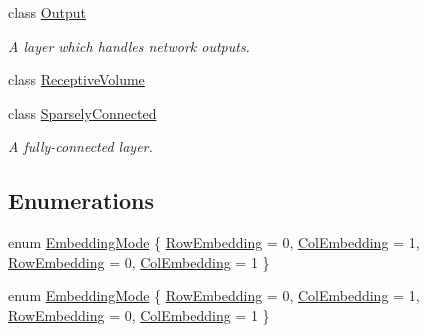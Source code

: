\begin{DoxyCompactItemize}
class \hyperlink{classffnn_1_1layer_1_1_output}{Output}
\begin{DoxyCompactList}\small\item\em A layer which handles network outputs. \end{DoxyCompactList}\item 
class \hyperlink{classffnn_1_1layer_1_1_receptive_volume}{Receptive\-Volume}
\item 
class \hyperlink{classffnn_1_1layer_1_1_sparsely_connected}{Sparsely\-Connected}
\begin{DoxyCompactList}\small\item\em A fully-\/connected layer. \end{DoxyCompactList}\end{DoxyCompactItemize}
\subsection*{Enumerations}
\begin{DoxyCompactItemize}
\item 
enum \hyperlink{namespaceffnn_1_1layer_a254f16beba4fb335d935e9b43bb9e69a}{Embedding\-Mode} \{ \hyperlink{namespaceffnn_1_1layer_a254f16beba4fb335d935e9b43bb9e69aa56bf723aeae4562f2fe05ae5e675da92}{Row\-Embedding} = 0, 
\hyperlink{namespaceffnn_1_1layer_a254f16beba4fb335d935e9b43bb9e69aaede1065f5863208cae7e55561966a182}{Col\-Embedding} = 1, 
\hyperlink{namespaceffnn_1_1layer_a254f16beba4fb335d935e9b43bb9e69aa56bf723aeae4562f2fe05ae5e675da92}{Row\-Embedding} = 0, 
\hyperlink{namespaceffnn_1_1layer_a254f16beba4fb335d935e9b43bb9e69aaede1065f5863208cae7e55561966a182}{Col\-Embedding} = 1
 \}
\item 
enum \hyperlink{namespaceffnn_1_1layer_a254f16beba4fb335d935e9b43bb9e69a}{Embedding\-Mode} \{ \hyperlink{namespaceffnn_1_1layer_a254f16beba4fb335d935e9b43bb9e69aa56bf723aeae4562f2fe05ae5e675da92}{Row\-Embedding} = 0, 
\hyperlink{namespaceffnn_1_1layer_a254f16beba4fb335d935e9b43bb9e69aaede1065f5863208cae7e55561966a182}{Col\-Embedding} = 1, 
\hyperlink{namespaceffnn_1_1layer_a254f16beba4fb335d935e9b43bb9e69aa56bf723aeae4562f2fe05ae5e675da92}{Row\-Embedding} = 0, 
\hyperlink{namespaceffnn_1_1layer_a254f16beba4fb335d935e9b43bb9e69aaede1065f5863208cae7e55561966a182}{Col\-Embedding} = 1
 \}
\end{DoxyCompactItemize}
